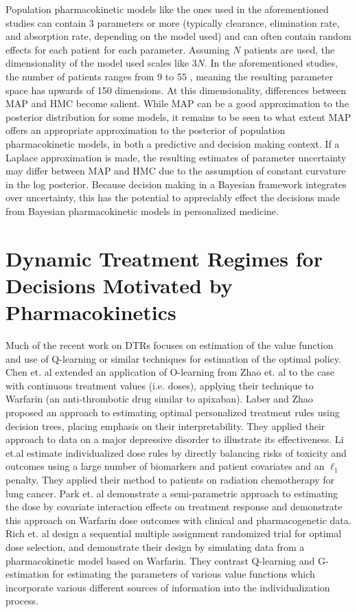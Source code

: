Population pharmacokinetic models like the ones used in the aforementioned studies can contain 3 parameters or more (typically clearance, elimination rate, and absorption rate, depending on the model used) and can often contain random effects for each patient for each parameter.  Assuming $N$ patients are used, the dimensionality of the model used scales like $3N$.  In the aforementioned studies, the number of patients ranges from 9 \cite{gibert2022development} to 55 \cite{sturkenboom2015pharmacokinetic}, meaning the resulting parameter space has upwards of 150 dimensions.  At this dimensionality, differences between MAP and HMC become salient. While MAP can be a good approximation to the posterior distribution for some models, it remains to be seen to what extent MAP offers an appropriate approximation to the posterior of population pharmacokinetic models, in both a predictive and decision making context.  If a Laplace approximation is made, the resulting estimates of parameter uncertainty may differ between MAP and HMC due to the assumption of constant curvature in the log posterior.  Because decision making in a Bayesian framework integrates over uncertainty, this has the potential to appreciably effect the decisions made from Bayesian pharmacokinetic models in personalized medicine.

\section{Dynamic Treatment Regimes for Decisions Motivated by Pharmacokinetics}

Much of the recent work on DTRs focuses on estimation of the value function and use of Q-learning or similar techniques for estimation of the optimal policy. Chen et. al \cite{chen2016personalized} extended an application of O-learning from Zhao et. al \cite{zhao2012estimating} to the case with continuous treatment values (i.e. doses), applying their technique to Warfarin (an anti-thrombotic drug similar to apixaban).  Laber and Zhao \cite{laber2015tree} proposed an approach to estimating optimal personalized treatment rules using decision trees, placing emphasis on their interpretability.  They applied their approach to data on a major depressive disorder to illustrate its effectiveness. Li et.al \cite{li2020utility} estimate individualized dose rules by directly balancing risks of toxicity and outcomes using a large number of biomarkers and patient covariates and an $\ell_1$ penalty.  They applied their method to patients on radiation chemotherapy for lung cancer. Park et. al \cite{park2021single} demonstrate a semi-parametric approach to estimating the dose by covariate interaction effects on treatment response and demonstrate this approach on Warfarin dose outcomes with clinical and pharmacogenetic data.  Rich et. al \cite{rich2014simulating} design a sequential multiple assignment randomized trial for optimal dose selection, and demonstrate their design by simulating data from a pharmacokinetic model based on Warfarin. They contrast Q-learning and G-estimation for estimating the parameters of various value functions which incorporate various different sources of information into the individualization process. 

